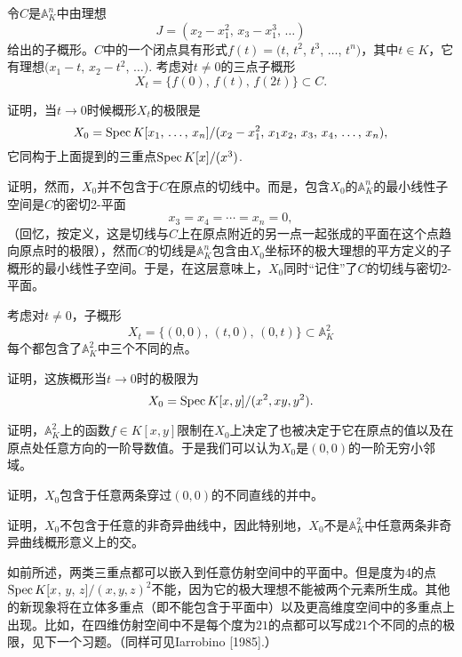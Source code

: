 \begin{exe}
	令$C$是$\mathbb{A}_K^n$中由理想
	\[
	J=(\text{$x_2-x_1^2$, $x_3-x_1^3$, $\dots$})
	\]
	给出的子概形。$C$中的一个闭点具有形式$f(t)=(t$, $t^2$, $t^3$, $\dots$, $t^n)$，其中$t\in K$，它有理想$(x_1-t$, $x_2-t^2$, $\dots)$. 考虑对$t\neq 0$的三点子概形
	\[
	X_t=\{\text{$f(0)$, $f(t)$, $f(2t)$}\}\subset C.
	\]

	\begin{compactenum}[(a)]
		\item 证明，当$t\to 0$时候概形$X_t$的极限是
		\[
		X_0=\operatorname{Spec} K[\text{$x_1$, $\dots$, $x_n$}]/(\text{$x_2-x_1^2$, $x_1x_2$, $x_3$, $x_4$, $\dots$, $x_n$}),
		\]
		它同构于上面提到的三重点$\operatorname{Spec} K[x]/(x^3)$.
		\item 证明，然而，$X_0$并不包含于$C$在原点的切线中。而是，包含$X_0$的$\mathbb{A}_K^n$的最小线性子空间是$C$的密切2-平面
		\[
		x_3=x_4=\cdots=x_n=0,
		\]
		（回忆，按定义，这是切线与$C$上在原点附近的另一点一起张成的平面在这个点趋向原点时的极限），然而$C$的切线是$\mathbb{A}_K^n$包含由$X_0$坐标环的极大理想的平方定义的子概形的最小线性子空间。于是，在这层意味上，$X_0$同时“记住”了$C$的切线与密切2-平面。
	\end{compactenum}
\end{exe}

\begin{exe}
	考虑对$t\neq 0$，子概形
	\[
	X_t=\{\text{$(0,0)$, $(t,0)$, $(0,t)$}\}\subset \mathbb{A}_K^2
	\]
	每个都包含了$\mathbb{A}_{K}^2$中三个不同的点。

	\begin{compactenum}[(a)]
		\item 证明，这族概形当$t\to 0$时的极限为
		\[
		X_0=\operatorname{Spec} K[x,y]/(x^2,xy,y^2).
		\]
		\item 证明，$\mathbb{A}_K^2$上的函数$f\in K[x,y]$限制在$X_0$上决定了也被决定于它在原点的值以及在原点处任意方向的一阶导数值。于是我们可以认为$X_0$是$(0,0)$的一阶无穷小邻域。
		\item 证明，$X_0$包含于任意两条穿过$(0,0)$的不同直线的并中。
		\item 证明，$X_0$不包含于任意的非奇异曲线中，因此特别地，$X_0$不是$\mathbb{A}_K^2$中任意两条非奇异曲线概形意义上的交。
	\end{compactenum}
\end{exe}

如前所述，两类三重点都可以嵌入到任意仿射空间中的平面中。但是度为4的点$\operatorname{Spec} K[x$, $y$, $z]/(x,y,z)^2$不能，因为它的极大理想不能被两个元素所生成。其他的新现象将在立体多重点（即不能包含于平面中）以及更高维度空间中的多重点上出现。比如，在四维仿射空间中不是每个度为$21$的点都可以写成$21$个不同的点的极限，见下一个习题。（同样可见Iarrobino [1985].）

